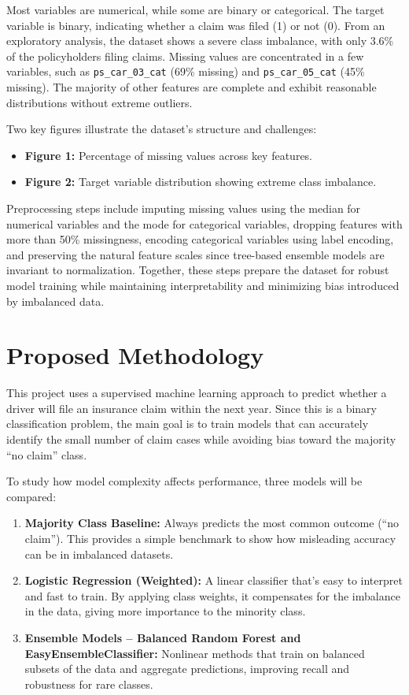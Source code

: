\documentclass[11pt]{article}
\begin{document}
Most variables are numerical, while some are binary or categorical. The target variable is binary, indicating whether a claim was filed (1) or not (0). From an exploratory analysis, the dataset shows a severe class imbalance, with only 3.6\% of the policyholders filing claims. Missing values are concentrated in a few variables, such as \texttt{ps\_car\_03\_cat} (69\% missing) and \texttt{ps\_car\_05\_cat} (45\% missing). The majority of other features are complete and exhibit reasonable distributions without extreme outliers.

Two key figures illustrate the dataset’s structure and challenges:
\begin{itemize}
    \item \textbf{Figure 1:} Percentage of missing values across key features.
    \item \textbf{Figure 2:} Target variable distribution showing extreme class imbalance.
\end{itemize}

Preprocessing steps include imputing missing values using the median for numerical variables and the mode for categorical variables, dropping features with more than 50\% missingness, encoding categorical variables using label encoding, and preserving the natural feature scales since tree-based ensemble models are invariant to normalization. Together, these steps prepare the dataset for robust model training while maintaining interpretability and minimizing bias introduced by imbalanced data.

\section{Proposed Methodology}
This project uses a supervised machine learning approach to predict whether a driver will file an insurance claim within the next year. Since this is a binary classification problem, the main goal is to train models that can accurately identify the small number of claim cases while avoiding bias toward the majority “no claim” class.

To study how model complexity affects performance, three models will be compared:
\begin{enumerate}
    \item \textbf{Majority Class Baseline:} Always predicts the most common outcome (“no claim”). This provides a simple benchmark to show how misleading accuracy can be in imbalanced datasets.
    \item \textbf{Logistic Regression (Weighted):} A linear classifier that’s easy to interpret and fast to train. By applying class weights, it compensates for the imbalance in the data, giving more importance to the minority class.
    \item \textbf{Ensemble Models – Balanced Random Forest and EasyEnsembleClassifier:} Nonlinear methods that train on balanced subsets of the data and aggregate predictions, improving recall and robustness for rare classes.
\end{enumerate}
\end{document}
